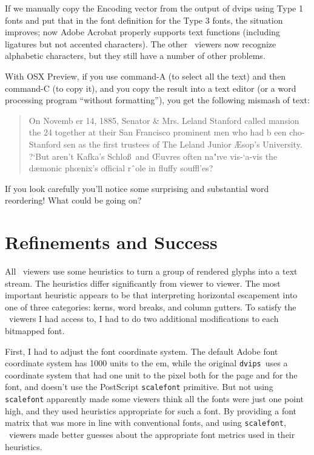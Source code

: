 \documentclass{ltugboat}
\def\PDF{\acro{PDF}}
\def\dvips{\texttt{dvips}}
\begin{document}
If we manually copy the Encoding vector from
the output of dvips using Type 1 fonts and put that
in the font definition for the Type 3 fonts, the situation
improves; now Adobe Acrobat properly supports text
functions (including ligatures but not accented
characters).  The other \PDF\ viewers now recognize
alphabetic characters, but they still have a number of
other problems.

With OSX Preview, if you use command-A
(to select all the text) and then command-C (to copy
it), and you copy the result into a text editor (or
a word processing program ``without formatting''),
you get the following mismash of text:

\begin{quote}
On Novemb er 14, 1885, Senator \& Mrs. Leland
Stanford called
mansion the 24
together at their San Francisco
prominent men who had
b een cho-
Stanford
sen as the first trustees of The Leland
Junior
{\AE}sop’s
University. ?`But aren’t Kafka’s Schlo\ss\ and
{\OE}uvres often na"ıve vis-`a-vis the dæmonic
ph{\oe}nix’s official rˆole in fluffy souffl'es?
\end{quote}
\noindent
If you look carefully you'll notice some surprising
and substantial word reordering!  What could
be going on?

\section{Refinements and Success}

All \PDF\ viewers use some heuristics
to turn a group of rendered glyphs into a text stream.
The heuristics differ significantly from viewer to
viewer.  The most important heuristic appears to be
that interpreting horizontal escapement into one of
three categories: kerns, word breaks, and column
gutters.  To satisfy the \PDF\ viewers I had access to,
I had to do two additional modifications to each bitmapped
font.

First, I had to adjust the font coordinate system.
The default Adobe font coordinate system has 1000 units
to the em, while the original
\dvips\ uses a coordinate system that had one unit to the
pixel both for the page and for the font, and doesn't use
the PostScript \texttt{scalefont} primitive.  But not using
\texttt{scalefont} apparently made some viewers think all the
fonts were just one point high, and they used heuristics
appropriate for such a font.  By providing a font matrix
that was more in line with conventional fonts, and using
\texttt{scalefont}, \PDF\ viewers made better guesses about
the appropriate font metrics used in their heuristics.
\end{document}

